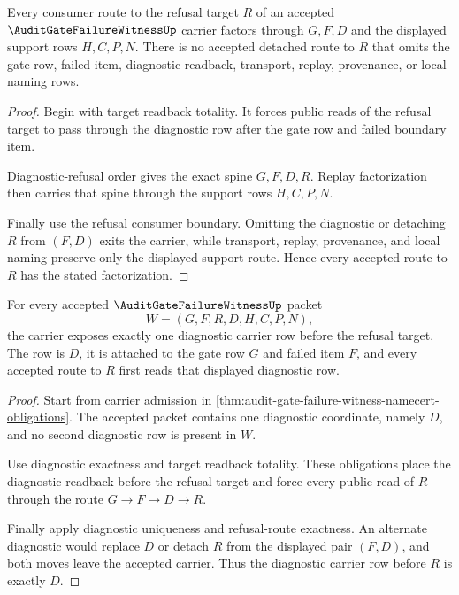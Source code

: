 \begin{theorem}
\label{thm:audit-gate-failure-witness-refusal-route-exactness}
Every consumer route to the refusal target $R$ of an accepted $\AuditGateFailureWitnessUp$ carrier factors through $G,F,D$ and the displayed support rows $H,C,P,N$. There is no accepted detached route to $R$ that omits the gate row, failed item, diagnostic readback, transport, replay, provenance, or local naming rows.
\end{theorem}
\begin{proof}
Begin with target readback totality. It forces public reads of the refusal target to pass through the diagnostic row after the gate row and failed boundary item.

Diagnostic-refusal order gives the exact spine $G,F,D,R$. Replay factorization then carries that spine through the support rows $H,C,P,N$.

Finally use the refusal consumer boundary. Omitting the diagnostic or detaching $R$ from $(F,D)$ exits the carrier, while transport, replay, provenance, and local naming preserve only the displayed support route. Hence every accepted route to $R$ has the stated factorization.
\end{proof}

\begin{theorem}
\label{thm:audit-gate-failure-witness-diagnostic-carrier-totality}
For every accepted $\AuditGateFailureWitnessUp$ packet
$$
W=(G,F,R,D,H,C,P,N),
$$
the carrier exposes exactly one diagnostic carrier row before the refusal target. The row is $D$, it is attached to the gate row $G$ and failed item $F$, and every accepted route to $R$ first reads that displayed diagnostic row.
\end{theorem}
\begin{proof}
Start from carrier admission in \autoref{thm:audit-gate-failure-witness-namecert-obligations}. The accepted packet contains one diagnostic coordinate, namely $D$, and no second diagnostic row is present in $W$.

Use diagnostic exactness and target readback totality. These obligations place the diagnostic readback before the refusal target and force every public read of $R$ through the route $G \to F \to D \to R$.

Finally apply diagnostic uniqueness and refusal-route exactness. An alternate diagnostic would replace $D$ or detach $R$ from the displayed pair $(F,D)$, and both moves leave the accepted carrier. Thus the diagnostic carrier row before $R$ is exactly $D$.
\end{proof}

